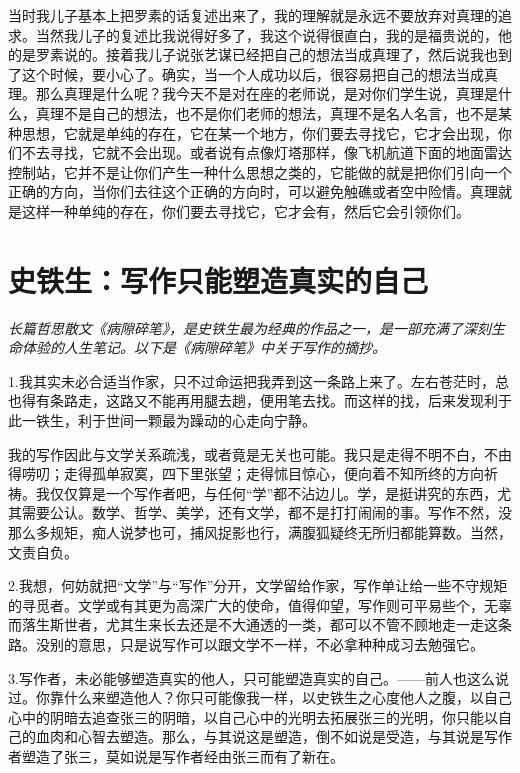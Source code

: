 \documentclass[12pt,a5paper]{ctexbook}
\begin{document}
当时我儿子基本上把罗素的话复述出来了，我的理解就是永远不要放弃对真理的追求。当然我儿子的复述比我说得好多了，我这个说得很直白，我的是福贵说的，他的是罗素说的。接着我儿子说张艺谋已经把自己的想法当成真理了，然后说我也到了这个时候，要小心了。确实，当一个人成功以后，很容易把自己的想法当成真理。那么真理是什么呢？我今天不是对在座的老师说，是对你们学生说，真理是什么，真理不是自己的想法，也不是你们老师的想法，真理不是名人名言，也不是某种思想，它就是单纯的存在，它在某一个地方，你们要去寻找它，它才会出现，你们不去寻找，它就不会出现。或者说有点像灯塔那样，像飞机航道下面的地面雷达控制站，它并不是让你们产生一种什么思想之类的，它能做的就是把你们引向一个正确的方向，当你们去往这个正确的方向时，可以避免触礁或者空中险情。真理就是这样一种单纯的存在，你们要去寻找它，它才会有，然后它会引领你们。

\newpage

\section{史铁生：写作只能塑造真实的自己}

\emph{长篇哲思散文《病隙碎笔》，是史铁生最为经典的作品之一，是一部充满了深刻生命体验的人生笔记。以下是《病隙碎笔》中关于写作的摘抄。}
\vspace{2em}

1.我其实未必合适当作家，只不过命运把我弄到这一条路上来了。左右苍茫时，总也得有条路走，这路又不能再用腿去趟，便用笔去找。而这样的找，后来发现利于此一铁生，利于世间一颗最为躁动的心走向宁静。

我的写作因此与文学关系疏浅，或者竟是无关也可能。我只是走得不明不白，不由得唠叨；走得孤单寂寞，四下里张望；走得怵目惊心，便向着不知所终的方向祈祷。我仅仅算是一个写作者吧，与任何“学”都不沾边儿。学，是挺讲究的东西，尤其需要公认。数学、哲学、美学，还有文学，都不是打打闹闹的事。写作不然，没那么多规矩，痴人说梦也可，捕风捉影也行，满腹狐疑终无所归都能算数。当然，文责自负。

2.我想，何妨就把“文学”与“写作”分开，文学留给作家，写作单让给一些不守规矩的寻觅者。文学或有其更为高深广大的使命，值得仰望，写作则可平易些个，无辜而落生斯世者，尤其生来长去还是不大通透的一类，都可以不管不顾地走一走这条路。没别的意思，只是说写作可以跟文学不一样，不必拿种种成习去勉强它。

3.写作者，未必能够塑造真实的他人，只可能塑造真实的自己。——前人也这么说过。你靠什么来塑造他人？你只可能像我一样，以史铁生之心度他人之腹，以自己心中的阴暗去追查张三的阴暗，以自己心中的光明去拓展张三的光明，你只能以自己的血肉和心智去塑造。那么，与其说这是塑造，倒不如说是受造，与其说是写作者塑造了张三，莫如说是写作者经由张三而有了新在。
\end{document}
